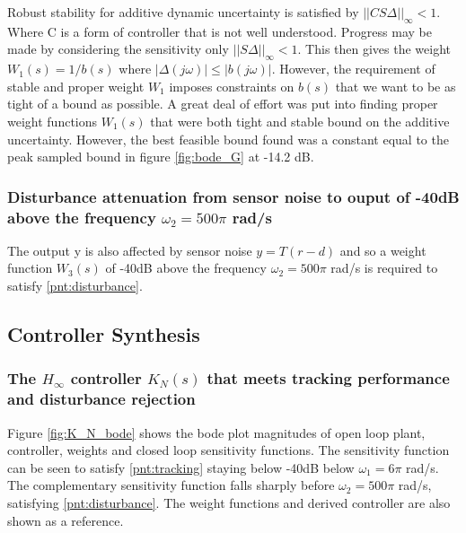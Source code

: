 \documentclass{article}
\begin{document}
Robust stability for additive dynamic uncertainty is satisfied by $||CS\Delta||_\infty < 1$.
Where C is a form of controller that is not well understood.
Progress may be made by considering the sensitivity only $||S\Delta||_\infty < 1$.
This then gives the weight $W_1(s) = 1/b(s)$ where $|\Delta(j\omega)| \le |b(j\omega)|$.
However, the requirement of stable and proper weight $W_1$ imposes constraints on $b(s)$ that we want to be as tight of a bound as possible.
A great deal of effort was put into finding proper weight functions $W_1(s)$ that were both tight and stable bound on the additive uncertainty.
However, the best feasible bound found was a constant equal to the peak sampled bound in figure \ref{fig:bode_G} at -14.2 dB.


\subsubsection{Disturbance attenuation from sensor noise to ouput of -40dB above the frequency $\omega_2 = 500\pi$ rad/s \label{pnt:disturbance}}

The output y is also affected by sensor noise $y = T(r - d)$ and so a weight function $W_3(s)$ of -40dB above the frequency $\omega_2 = 500\pi$ rad/s is required to satisfy \ref{pnt:disturbance}.
\subsection{Controller Synthesis}

\subsubsection{The $H_\infty$ controller $K_N(s)$ that meets tracking performance and disturbance rejection}

Figure \ref{fig:K_N_bode} shows the bode plot magnitudes of open loop plant, controller, weights and closed loop sensitivity functions.
The sensitivity function can be seen to satisfy \ref{pnt:tracking} staying below -40dB below $\omega_1 = 6\pi$ rad/s.
The complementary sensitivity function falls sharply before $\omega_2 = 500\pi$ rad/s, satisfying \ref{pnt:disturbance}.
The weight functions and derived controller are also shown as a reference.
\end{document}

